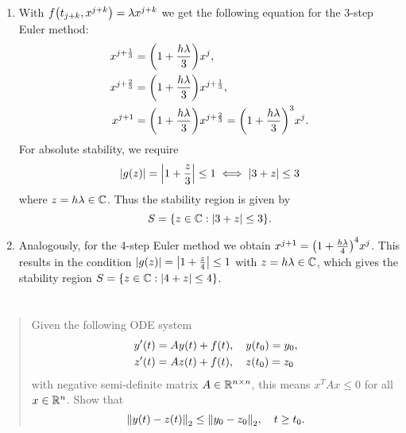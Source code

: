 \documentclass{exercise}
\begin{document}
	\begin{enumerate}
		\item With \(f\parentheses*{t_{j + k}, x^{j + k}} = \lambda x^{j + k}\) we get the following equation for the 3-step Euler method:
		\begin{align*}
			x^{j + \frac{1}{3}} &= \parentheses*{1 + \frac{h\lambda}{3}}x^j,\\
			x^{j + \frac{2}{3}} &= \parentheses*{1 + \frac{h\lambda}{3}}x^{j + \frac{1}{3}},\\
			x^{j + 1} &= \parentheses*{1 + \frac{h\lambda}{3}}x^{j + \frac{2}{3}} = \parentheses*{1 + \frac{h\lambda}{3}}^3 x^j.
		\end{align*}
		For absolute stability, we require
		\[
			\absolute*{g\parentheses*{z}} = \absolute*{1 + \frac{z}{3}} \le 1 \iff \absolute*{3 + z} \le 3
		\]
		where \(z = h\lambda \in \C\).
		Thus the stability region is given by
		\[
			S = \braces*{z \in \C : \absolute*{3 + z} \le 3}.
		\]
		\item Analogously, for the 4-step Euler method we obtain \(x^{j + 1} = \parentheses*{1 + \frac{h\lambda}{4}}^4 x^j\).
		This results in the condition \(\absolute*{g\parentheses*{z}} = \absolute*{1 + \frac{z}{4}} \le 1\) with \(z = h\lambda \in \C\), which gives the stability region \(S = \braces*{z \in \C : \absolute*{4 + z} \le 4}\).
	\end{enumerate}


	\section{}

	\begin{quote}
		Given the following ODE system
		\begin{align*}
			y'\parentheses*{t} &= Ay\parentheses*{t} + f\parentheses*{t}, \quad y\parentheses*{t_0} = y_0,\\
			z'\parentheses*{t} &= Az\parentheses*{t} + f\parentheses*{t}, \quad z\parentheses*{t_0} = z_0
		\end{align*}
		with negative semi-definite matrix \(A \in \R^{n \times n}\), this means \(x^T Ax \le 0\) for all \(x \in \R^n\).
		Show that
		\[
			\norm*{y\parentheses*{t} - z\parentheses*{t}}_2 \le \norm*{y_0 - z_0}_2, \quad t \ge t_0.
		\]
	\end{quote}
\end{document}
